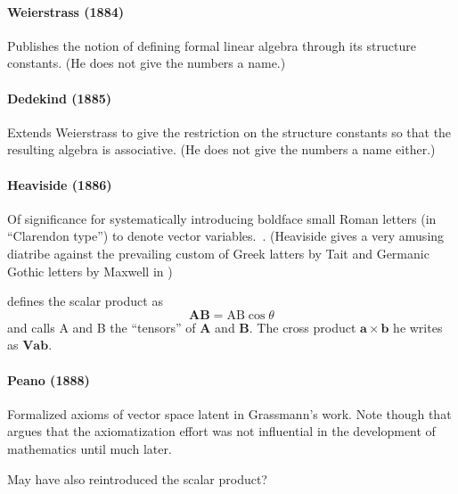 

\paragraph{Weierstrass (1884)~\cite{Weierstrass1884}}

Publishes the notion of defining formal linear algebra through its structure constants. (He does not give the numbers a name.)



\paragraph{Dedekind (1885)~\cite{Dedekind1885}}

Extends Weierstrass to give the restriction on the structure constants so that the resulting algebra is associative. (He does not give the numbers a name either.)



\paragraph{Heaviside (1886)~\cite{Heaviside1886}}

Of significance for systematically introducing boldface small Roman letters (in ``Clarendon type'') to denote vector variables.~\cite{Heaviside1886}. (Heaviside gives a very amusing diatribe against the prevailing custom of Greek latters by Tait and Germanic Gothic letters by Maxwell in \cite[\S 103, pp. 139-142]{Heaviside1894})


\cite[\S 107]{Heaviside1894} defines the scalar product as
\[
\mathbf{AB} = \mathrm{AB} \cos \theta
\]
and calls A and B the ``tensors'' of $\mathbf{A}$ and $\mathbf{B}$. The cross product $\mathbf a \times \mathbf b$ he writes as $\mathbf{V a b}$.

\paragraph{Peano (1888)~\cite{Peano1888}}

Formalized axioms of vector space latent in Grassmann's work. Note though that \cite{Moore1995} argues that the axiomatization effort was not influential in the development of mathematics until much later.

May have also reintroduced the scalar product?

